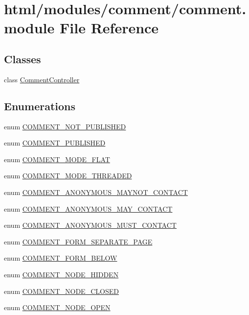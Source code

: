 \hypertarget{comment_8module}{
\section{html/modules/comment/comment.module File Reference}
\label{comment_8module}
}
\subsection*{Classes}
\begin{DoxyCompactItemize}
\item 
class \hyperlink{classCommentController}{CommentController}
\end{DoxyCompactItemize}
\subsection*{Enumerations}
\begin{DoxyCompactItemize}
\item 
enum \hyperlink{comment_8module_a7676ab23ca9d0f0b4d22c02b55eb65e8}{COMMENT\_\-NOT\_\-PUBLISHED} 
\item 
enum \hyperlink{comment_8module_a96f12d706e4ce5b60b90141d07b02c5f}{COMMENT\_\-PUBLISHED} 
\item 
enum \hyperlink{comment_8module_aaff50a0f429a31a0fc9ecf35198eb7d9}{COMMENT\_\-MODE\_\-FLAT} 
\item 
enum \hyperlink{comment_8module_a0d8620524afbb2361870c03c1c9d95dc}{COMMENT\_\-MODE\_\-THREADED} 
\item 
enum \hyperlink{comment_8module_a434cd95ddfa8fce4da883c5ced78dba4}{COMMENT\_\-ANONYMOUS\_\-MAYNOT\_\-CONTACT} 
\item 
enum \hyperlink{comment_8module_a4c2165b321b42d7a819a45338702d1f0}{COMMENT\_\-ANONYMOUS\_\-MAY\_\-CONTACT} 
\item 
enum \hyperlink{comment_8module_a41a3f08b14c97f4603e336ba7173deae}{COMMENT\_\-ANONYMOUS\_\-MUST\_\-CONTACT} 
\item 
enum \hyperlink{comment_8module_a7b303650179b46414b9809bac9f15e33}{COMMENT\_\-FORM\_\-SEPARATE\_\-PAGE} 
\item 
enum \hyperlink{comment_8module_a1d93fd4a39f5ec90008efb08cde55d45}{COMMENT\_\-FORM\_\-BELOW} 
\item 
enum \hyperlink{comment_8module_a685d9e48203a970ba98b5a734eb0c2b5}{COMMENT\_\-NODE\_\-HIDDEN} 
\item 
enum \hyperlink{comment_8module_a02cedc820778a12afc48724a53acc228}{COMMENT\_\-NODE\_\-CLOSED} 
\item 
enum \hyperlink{comment_8module_aff2d44a87e79044004ed35b97ab84582}{COMMENT\_\-NODE\_\-OPEN} 
\end{DoxyCompactItemize}
